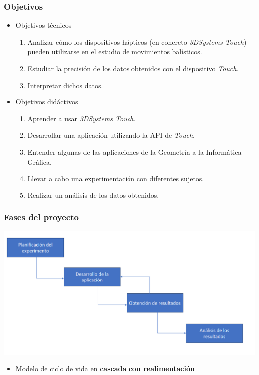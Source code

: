 \documentclass[pdf]{beamer}
\begin{document}
\begin{frame}
\frametitle{Objetivos}
\begin{itemize}
	\item Objetivos técnicos
	\begin{enumerate}
		\item Analizar cómo los dispositivos hápticos (en concreto \textit{3DSystems Touch}) pueden utilizarse en el estudio de movimientos balísticos.
		\item Estudiar la precisión de los datos obtenidos con el dispositivo \textit{Touch}.
		\item Interpretar dichos datos.
	\end{enumerate}
	\item Objetivos didáctivos
	\begin{enumerate}
		\item Aprender a usar \textit{3DSystems Touch}.
		\item Desarrollar una aplicación utilizando la API de \textit{Touch}.
		\item Entender algunas de las aplicaciones de la Geometría a la Informática Gráfica.
		\item Llevar a cabo una experimentación con diferentes sujetos.
		\item Realizar un análisis de los datos obtenidos.
	\end{enumerate}
\end{itemize}

\end{frame}

\begin{frame}
\frametitle{Fases del proyecto}	
\includegraphics[width=\linewidth]{diagrama-fases}
\begin{itemize}
	\item Modelo de ciclo de vida en \textbf{cascada con realimentación}
\end{itemize}

\end{frame}
\end{document}
